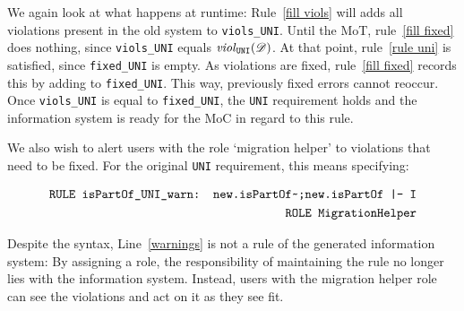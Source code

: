 \documentclass[runningheads]{llncs}
\newcommand{\id}[1]{\text{\it #1\/}}
\newcommand{\viol}[2]{\violC{#1}(#2)}
\newcommand{\violC}[1]{\id{viol}_{#1}}
\newcommand{\dataset}{\mathscr{D}}
\begin{document}
   We again look at what happens at runtime:
   Rule~\ref{fill viols} will adds all violations present in the old system to {\tt viols\_UNI}.
   Until the MoT, rule~\ref{fill fixed} does nothing, since {\tt viols\_UNI} equals $\viol{\tt UNI}{\dataset}$.
   At that point, rule~\ref{rule uni} is satisfied, since {\tt fixed\_UNI} is empty.
   As violations are fixed, rule~\ref{fill fixed} records this by adding to {\tt fixed\_UNI}.
   This way, previously fixed errors cannot reoccur.
   Once {\tt viols\_UNI} is equal to {\tt fixed\_UNI}, the \verb=UNI= requirement holds and the information system is ready for the MoC in regard to this rule.
   
   We also wish to alert users with the role `migration helper' to violations that need to be fixed.
   For the original \verb=UNI= requirement, this means specifying:
   
   \begin{align}
   \begin{aligned}
   \text{\tt RULE isPartOf\_UNI\_warn: new.isPartOf\textasciitilde;new.isPartOf |- I}\\
   \quad\text{\tt ROLE MigrationHelper}
   \end{aligned}\label{warnings}
   \end{align}
   
   Despite the syntax, Line~{\ref{warnings}} is not a rule of the generated information system:
   By assigning a role, the responsibility of maintaining the rule no longer lies with the information system.
   Instead, users with the migration helper role can see the violations and act on it as they see fit.
\end{document}
